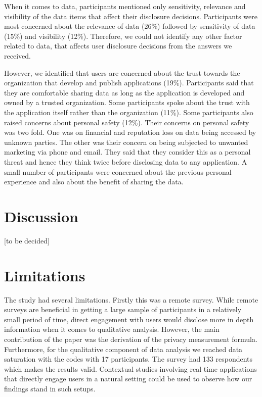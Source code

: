 \documentclass[conference]{IEEEtran}
\begin{document}
When it comes to data, participants mentioned only sensitivity, relevance and visibility of the data items that affect their disclosure decisions. Participants were most concerned about the relevance of data (26\%) followed by sensitivity of data (15\%) and visibility (12\%). Therefore, we could not identify any other factor related to data, that affects user disclosure decisions from the answers we received. 

However, we identified that users are concerned about the trust towards the organization that develop and publish applications (19\%). Participants said that they are comfortable sharing data as long as the application is developed and owned by a trusted organization. Some participants spoke about the trust with the application itself rather than the organization (11\%). Some participants also raised concerns about personal safety (12\%). Their concerns on personal safety was two fold. One was on financial and reputation loss on data being accessed by unknown parties. The other was their concern on being subjected to unwanted marketing via phone and email. They said that they consider this as a personal threat and hence they think twice before disclosing data to any application. A small number of participants were concerned about the previous personal experience and also about the benefit of sharing the data. 

\section{Discussion}

[to be decided]

\section {Limitations}

The study had several limitations. Firstly this was a remote survey. While remote surveys are beneficial in getting a large sample of participants in a relatively small period of time, direct engagement with users would disclose more in depth information when it comes to qualitative analysis. However, the main contribution of the paper was the derivation of the privacy measurement formula. Furthermore, for the qualitative component of data analysis we reached data saturation with the codes with 17 participants. The survey had 133 respondents which makes the results valid. Contextual studies involving real time applications that directly engage users in a natural setting could be used to observe how our findings stand in such setups.
\end{document}
